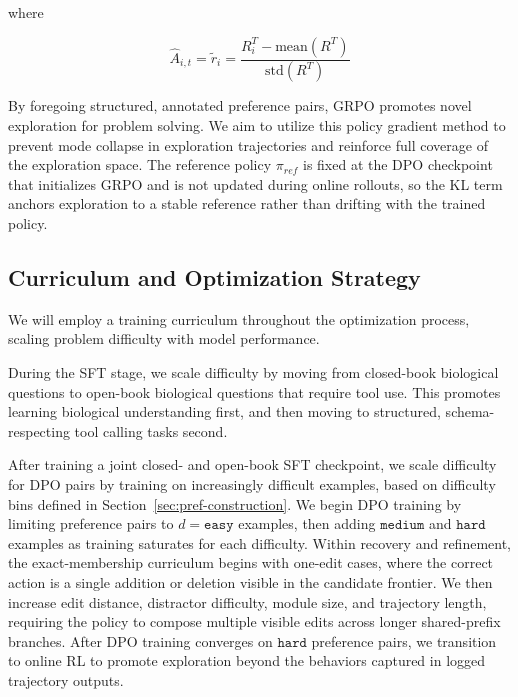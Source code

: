 \documentclass[thesis,letterpaper,12pt]{utthesis}
\begin{document}
where 

\[
\hat A_{i,t} = \tilde{r}_i  = \frac{R^{T}_i - \text{mean}(R^{T})}{\text{std}(R^{T})}
\]

By foregoing structured, annotated preference pairs, GRPO promotes novel exploration for problem solving. We aim to utilize this policy gradient method to prevent mode collapse in exploration trajectories and reinforce full coverage of the exploration space. The reference policy $\pi_{ref}$ is fixed at the DPO checkpoint that initializes GRPO and is not updated during online rollouts, so the KL term anchors exploration to a stable reference rather than drifting with the trained policy.

\subsection{Curriculum and Optimization Strategy}\label{sec:curriculum}
We will employ a training curriculum throughout the optimization process, scaling problem difficulty with model performance. 

During the SFT stage, we scale difficulty by moving from closed-book biological questions to open-book biological questions that require tool use. This promotes learning biological understanding first, and then moving to structured, schema-respecting tool calling tasks second.

After training a joint closed- and open-book SFT checkpoint, we scale difficulty for DPO pairs by training on increasingly difficult examples, based on difficulty bins defined in Section~\ref{sec:pref-construction}. We begin DPO training by limiting preference pairs to $d = \texttt{easy}$ examples, then adding $\texttt{medium}$ and $\texttt{hard}$ examples as training saturates for each difficulty. Within recovery and refinement, the exact-membership curriculum begins with one-edit cases, where the correct action is a single addition or deletion visible in the candidate frontier. We then increase edit distance, distractor difficulty, module size, and trajectory length, requiring the policy to compose multiple visible edits across longer shared-prefix branches. After DPO training converges on $\texttt{hard}$ preference pairs, we transition to online RL to promote exploration beyond the behaviors captured in logged trajectory outputs.
\end{document}

